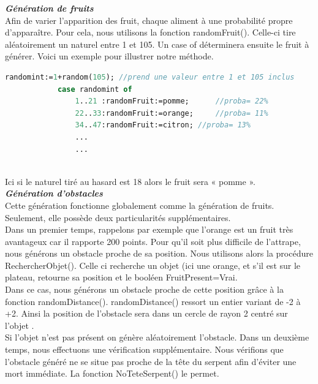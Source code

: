 \documentclass[11pt,a4paper]{article}
\begin{document}
        \textit{\textbf{Génération de fruits }}\\
        Afin de varier l’apparition des fruit, chaque aliment à une probabilité propre d’apparaître.
        Pour cela, nous utilisons la fonction randomFruit().
        Celle-ci tire aléatoirement un naturel entre 1 et 105. Un case of  déterminera ensuite le fruit à générer. 
        Voici un exemple pour illustrer notre méthode. 
       \small
         \begin{lstlisting}[language=Pascal,frame=single,caption=Code source la procédure randomFruit]
        randomint:=1+random(105); //prend une valeur entre 1 et 105 inclus
            case randomint of            
                1..21 :randomFruit:=pomme;   	//proba= 22%
                22..33:randomFruit:=orange; 	//proba= 11%
                34..47:randomFruit:=citron;	//proba= 13%
                ...
                ...
     
         \end{lstlisting}

        \normalsize
        Ici si le naturel tiré au hasard est 18 alors le fruit sera « pomme ».\\

        \newpage
         \textit{\textbf{Génération d'obstacles }}\\
        Cette génération fonctionne globalement comme la génération de fruits. Seulement, elle possède deux particularités supplémentaires.\\ 
        Dans un premier temps, rappelons par exemple que l’orange est un fruit très avantageux car il rapporte 200 points. Pour qu’il soit plus difficile de l’attrape, nous générons un obstacle proche de sa position.
        Nous utilisons alors la procédure RechercherObjet(). Celle ci recherche un objet (ici une orange, et s’il est sur le plateau, retourne sa position et le booléen FruitPresent=Vrai. \\
        Dans ce cas, nous générons un obstacle proche de cette position grâce à la fonction randomDistance(). 
        randomDistance() ressort un entier variant de -2 à +2. Ainsi la position de l’obstacle sera dans un cercle de rayon 2 centré sur l’objet .  \\
        Si l’objet n’est pas présent on génère aléatoirement l’obstacle.
        Dans un deuxième temps, nous effectuons une vérification supplémentaire. Nous vérifions que l’obstacle généré ne se situe pas proche de la tête du serpent afin d’éviter une mort immédiate. La fonction NoTeteSerpent() le permet.  
        
\end{document}
